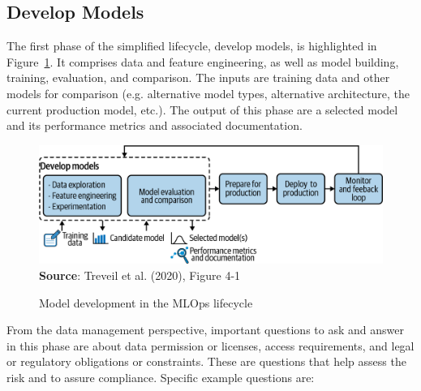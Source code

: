 \FloatBarrier
\subsection{Develop Models}

The first phase of the simplified lifecycle, develop models, is highlighted in Figure~\ref{fig:developmodels}. It comprises data and feature engineering, as well as model building, training, evaluation, and comparison. The inputs are training data and other models for comparison (e.g. alternative model types, alternative architecture, the current production model, etc.). The output of this phase are a selected model and its performance metrics and associated documentation. 

\begin{figure}
\centering
\includegraphics[width=.75\textwidth]{imlo_0401.png} \\

\vspace{\baselineskip}
\scriptsize \textbf{Source}: Treveil et al. (2020), Figure 4-1
\caption{Model development in the MLOps lifecycle}
\label{fig:developmodels}
\end{figure}

From the data management perspective, important questions to ask and answer in this phase are about data permission or licenses, access requirements, and legal or regulatory obligations or constraints. These are questions that help assess the risk and to assure compliance. Specific example questions are:

